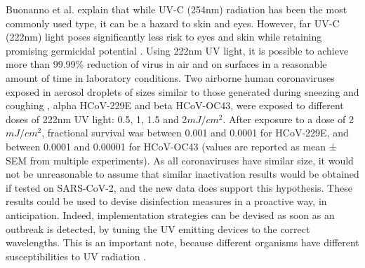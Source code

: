 \documentclass[11pt]{report}
\begin{document}
Buonanno et al. \cite{far uvc effectively} explain that while UV-C (254nm) radiation has been the most commonly used type, it can be a hazard to skin and eyes. However, far UV-C (222nm) light poses significantly less risk to eyes and skin while retaining promising germicidal potential \cite{far uvc effectively} \cite{phys} \cite{safety}. Using 222nm UV light, it is possible to achieve more than 99.99\% reduction of virus in air and on surfaces in a reasonable amount of time in laboratory conditions. Two airborne human coronaviruses exposed in aerosol droplets of sizes similar to those generated during sneezing and coughing \cite{droplets}, alpha HCoV-229E and beta HCoV-OC43, were exposed to different doses of 222nm UV light: 0.5, 1, 1.5 and 2$mJ/cm^2$. After exposure to a dose of 2 $mJ/cm^2$, fractional survival was between 0.001 and 0.0001 for HCoV-229E, and between 0.0001 and 0.00001 for HCoV-OC43 (values are reported as mean ± SEM from multiple experiments). As all coronaviruses have similar size, it would not be unreasonable to assume that similar inactivation results would be obtained if tested on SARS-CoV-2, and the new data does support this hypothesis. These results could be used to devise disinfection measures in a proactive way, in anticipation. Indeed, implementation strategies can be devised as soon as an outbreak is detected, by tuning the UV emitting devices to the correct wavelengths. This is an important note, because different organisms have different susceptibilities to UV radiation \cite{critical}.
\end{document}
